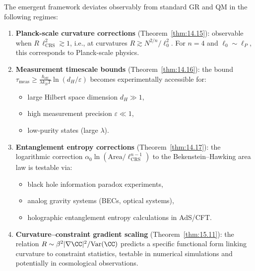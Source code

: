 \begin{theorem}\label{thm:15.12}
The emergent framework deviates observably from standard GR and QM in
the following regimes:
\begin{enumerate}
  \item \textbf{Planck-scale curvature corrections}
        (Theorem~\ref{thm:14.15}): observable when
        $R\,\ell_{\mathrm{CRS}}^2 \gtrsim 1$, i.e., at curvatures
        $R \gtrsim N^{2/n}/\ell_0^2$.  For $n = 4$ and
        $\ell_0 \sim \ell_P$, this corresponds to Planck-scale physics.

  \item \textbf{Measurement timescale bounds}
        (Theorem~\ref{thm:14.16}): the bound
        $\tau_{\mathrm{meas}} \geq \frac{\hbar_{\mathrm{eff}}}
        {\lambda k_B T}\ln(d_H/\varepsilon)$ becomes experimentally
        accessible for:
        \begin{itemize}
          \item large Hilbert space dimension $d_H \gg 1$,
          \item high measurement precision $\varepsilon \ll 1$,
          \item low-purity states (large $\lambda$).
        \end{itemize}

  \item \textbf{Entanglement entropy corrections}
        (Theorem~\ref{thm:14.17}): the logarithmic correction
        $\alpha_0\ln(\mathrm{Area}/\ell_{\mathrm{CRS}}^{n-1})$ to the
        Bekenstein--Hawking area law is testable via:
        \begin{itemize}
          \item black hole information paradox experiments,
          \item analog gravity systems (BECs, optical systems),
          \item holographic entanglement entropy calculations in
                AdS/CFT.
        \end{itemize}

  \item \textbf{Curvature--constraint gradient scaling}
        (Theorem~\ref{thm:15.11}): the relation
        $R \sim \beta^2|\nabla\CC|^2/\mathrm{Var}(\CC)$ predicts a
        specific functional form linking curvature to constraint
        statistics, testable in numerical simulations and potentially
        in cosmological observations.
\end{enumerate}
\end{theorem}

